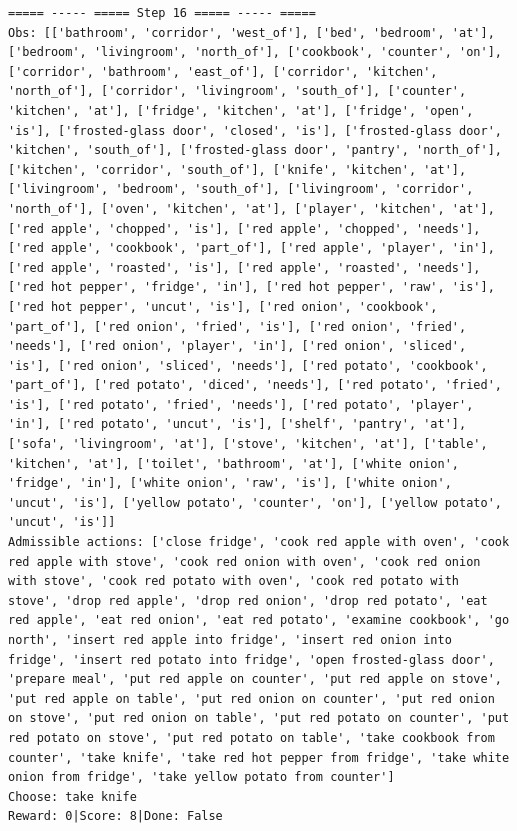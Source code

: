 \documentclass[11pt]{article}
\begin{document}
\begin{lstlisting}
===== ----- ===== Step 16 ===== ----- =====
Obs: [['bathroom', 'corridor', 'west_of'], ['bed', 'bedroom', 'at'], ['bedroom', 'livingroom', 'north_of'], ['cookbook', 'counter', 'on'], ['corridor', 'bathroom', 'east_of'], ['corridor', 'kitchen', 'north_of'], ['corridor', 'livingroom', 'south_of'], ['counter', 'kitchen', 'at'], ['fridge', 'kitchen', 'at'], ['fridge', 'open', 'is'], ['frosted-glass door', 'closed', 'is'], ['frosted-glass door', 'kitchen', 'south_of'], ['frosted-glass door', 'pantry', 'north_of'], ['kitchen', 'corridor', 'south_of'], ['knife', 'kitchen', 'at'], ['livingroom', 'bedroom', 'south_of'], ['livingroom', 'corridor', 'north_of'], ['oven', 'kitchen', 'at'], ['player', 'kitchen', 'at'], ['red apple', 'chopped', 'is'], ['red apple', 'chopped', 'needs'], ['red apple', 'cookbook', 'part_of'], ['red apple', 'player', 'in'], ['red apple', 'roasted', 'is'], ['red apple', 'roasted', 'needs'], ['red hot pepper', 'fridge', 'in'], ['red hot pepper', 'raw', 'is'], ['red hot pepper', 'uncut', 'is'], ['red onion', 'cookbook', 'part_of'], ['red onion', 'fried', 'is'], ['red onion', 'fried', 'needs'], ['red onion', 'player', 'in'], ['red onion', 'sliced', 'is'], ['red onion', 'sliced', 'needs'], ['red potato', 'cookbook', 'part_of'], ['red potato', 'diced', 'needs'], ['red potato', 'fried', 'is'], ['red potato', 'fried', 'needs'], ['red potato', 'player', 'in'], ['red potato', 'uncut', 'is'], ['shelf', 'pantry', 'at'], ['sofa', 'livingroom', 'at'], ['stove', 'kitchen', 'at'], ['table', 'kitchen', 'at'], ['toilet', 'bathroom', 'at'], ['white onion', 'fridge', 'in'], ['white onion', 'raw', 'is'], ['white onion', 'uncut', 'is'], ['yellow potato', 'counter', 'on'], ['yellow potato', 'uncut', 'is']]
Admissible actions: ['close fridge', 'cook red apple with oven', 'cook red apple with stove', 'cook red onion with oven', 'cook red onion with stove', 'cook red potato with oven', 'cook red potato with stove', 'drop red apple', 'drop red onion', 'drop red potato', 'eat red apple', 'eat red onion', 'eat red potato', 'examine cookbook', 'go north', 'insert red apple into fridge', 'insert red onion into fridge', 'insert red potato into fridge', 'open frosted-glass door', 'prepare meal', 'put red apple on counter', 'put red apple on stove', 'put red apple on table', 'put red onion on counter', 'put red onion on stove', 'put red onion on table', 'put red potato on counter', 'put red potato on stove', 'put red potato on table', 'take cookbook from counter', 'take knife', 'take red hot pepper from fridge', 'take white onion from fridge', 'take yellow potato from counter']
Choose: take knife
Reward: 0|Score: 8|Done: False


\end{lstlisting}
\end{document}
